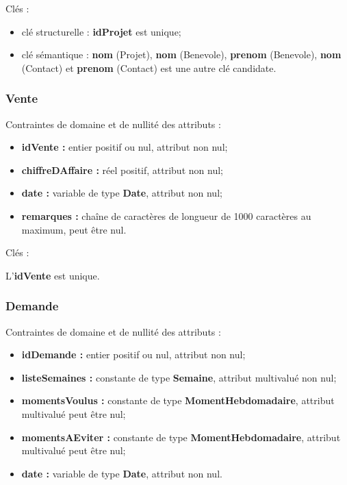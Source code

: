Clés : 
\begin{itemize}
\item clé structurelle : \textbf{idProjet} est unique;
\item clé sémantique : \textbf{nom} (Projet), \textbf{nom} (Benevole), \textbf{prenom} (Benevole), \textbf{nom} (Contact) et \textbf{prenom} (Contact) est une autre clé candidate. \\ 
\end{itemize}

\subsubsection*{Vente}
Contraintes de domaine et de nullité des attributs :
\begin{itemize}
 	\item \textbf{idVente :} entier positif ou nul, attribut non nul;
	\item \textbf{chiffreDAffaire :} réel positif, attribut non nul;
	\item \textbf{date :} variable de type \textbf{Date}, attribut non nul;
	\item \textbf{remarques :} chaîne de caractères de longueur de 1000 caractères au maximum, peut être nul. \\  
\end{itemize} 

Clés : 

L'\textbf{idVente} est unique.\\

\subsubsection*{Demande}
Contraintes de domaine et de nullité des attributs :
\begin{itemize}
	\item \textbf{idDemande :} entier positif ou nul, attribut non nul;
 	\item \textbf{listeSemaines :} constante de type \textbf{Semaine}, attribut multivalué non nul; 
	\item \textbf{momentsVoulus :} constante de type \textbf{MomentHebdomadaire}, attribut multivalué peut être nul;
	\item \textbf{momentsAEviter :} constante de type \textbf{MomentHebdomadaire}, attribut multivalué peut être nul;
	\item \textbf{date :} variable de type \textbf{Date}, attribut non nul.\\
\end{itemize} 

